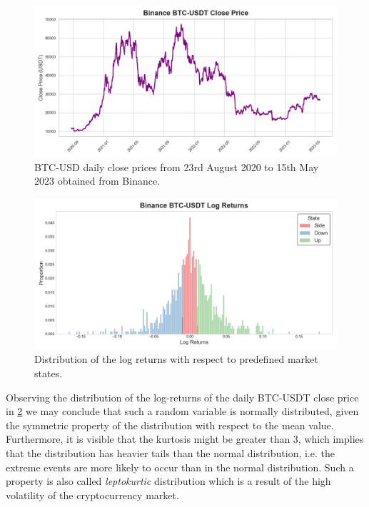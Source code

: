 \begin{figure}[htbp]
    \begin{center}
        \includegraphics[width=1.0\textwidth]{Figs/BTC-USD.png}
        \caption{BTC-USD daily close prices from 23rd August 2020 to 15th May 2023 obtained from Binance. \cite{tradingview}}
        \label{fig:BTC-USD}
    \end{center}
\end{figure}

\begin{figure}[htbp]
    \begin{center}
        \includegraphics[width=1.0\textwidth]{Figs/BTC-USD_hist.png}
        \caption{Distribution of the log returns with respect to predefined market states. \cite{tradingview}}
        \label{fig:BTC-USD-distribution}
    \end{center}
\end{figure}

Observing the distribution of the log-returns of the daily BTC-USDT close price in \ref{fig:BTC-USD-distribution} we may conclude that such a random variable is normally distributed,
given the symmetric property of the distribution with respect to the mean value. Furthermore, it is visible that the kurtosis might be greater than 3,
which implies that the distribution has heavier tails than the normal distribution, i.e. the extreme events are more likely to occur than in the normal distribution.
Such a property is also called \textit{leptokurtic} distribution which is a result of the high volatility of the cryptocurrency market. \cite{Peters1994}

